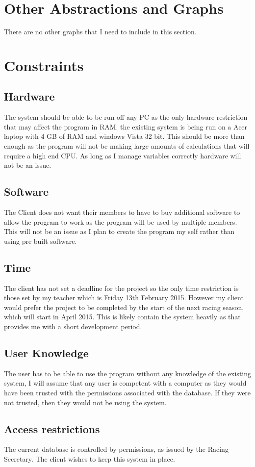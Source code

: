 \section{Other Abstractions and Graphs}
There are no other graphs that I need to include in this section.
\section{Constraints}

\subsection{Hardware}
The system should be able to be run off any PC as the only hardware restriction that may affect the program in RAM. the existing system is being run on a Acer laptop with 4 GB of RAM and windows Vista 32 bit. This should be more than enough as the program will not be making large amounts of calculations that will require a high end CPU. As long as I manage variables correctly hardware will not be an issue.
\subsection{Software}
The Client does not want their members to have to buy additional software to allow the program to work as the program will be used by multiple members. This will not be an issue as I plan to create the program my self rather than using pre built software.
\subsection{Time}
The client has not set a deadline for the project so the only time restriction is those set by my teacher which is Friday 13th February 2015. However my client would prefer the project to be completed by the start of the next racing season, which will start in April 2015. This is likely contain the system heavily as that provides me with a short development period.
\subsection{User Knowledge}
The user has to be able to use the program without any knowledge of the existing system, I will assume that any user is competent with a computer as they would have been trusted with the permissions associated with the database. If they were not trusted, then they would not be using the system.
\subsection{Access restrictions}
The current database is controlled by permissions, as issued by the Racing Secretary. The client wishes to keep this system in place.
